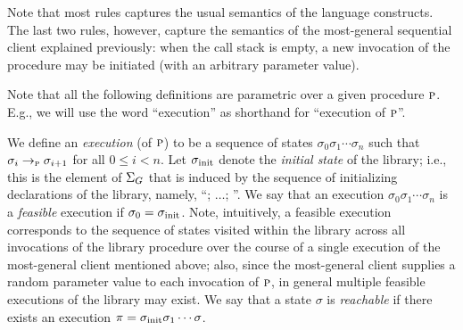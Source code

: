 Note that most rules captures the usual semantics of the language constructs.
The last two rules, however, capture the semantics of the most-general sequential
client explained previously: when the call stack is empty, a new invocation of
the procedure may be initiated (with an arbitrary parameter value).


Note that all the following definitions are parametric over a given procedure $\textsc{p}$.
E.g., we will use the word ``execution'' as shorthand for ``execution of $\textsc{p}$''.

We define an \emph{execution} (of $\textsc{p}$) to be a sequence of states $\sigma_0 \sigma_1 \cdots \sigma_n$ such that
$\sigma_i \rightarrow_{\textsc{p}} \sigma_{i+1}$ for all $0 \leq i < n$.
Let $\sigma_{\text{init}}$ denote the \emph{initial state} of the library; i.e., this
is the element of $\Sigma_G$ that is induced by the sequence of initializing declarations of
the library, namely, ``;
$\ldots$; ''.
We say that an execution $\sigma_0 \sigma_1 \cdots \sigma_n$ is a
\emph{feasible} execution if $\sigma_0 = \sigma_{\text{init}}$. Note, 
intuitively, a feasible execution  corresponds to the sequence
of states visited within the library across all invocations of
the library procedure over the course of a single execution of
the most-general client mentioned above; also, since the most-general client
supplies a random parameter value to each invocation of $\textsc{p}$, in general
multiple feasible executions of the library may exist.
We say that a state $\sigma$ is \emph{ reachable} if there exists an execution $\pi = \sigma_{\text{init}} \sigma_1 \cdots \sigma$.


